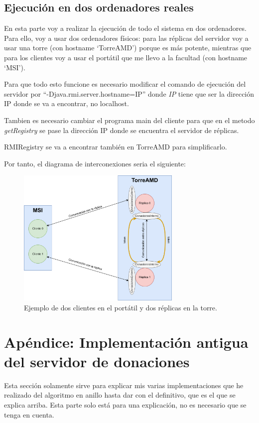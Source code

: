 \documentclass{article}
\begin{document}
\subsection{Ejecución en dos ordenadores reales}
En esta parte voy a realizar la ejecución de todo el sistema en dos ordenadores. Para ello, voy a usar dos ordenadores físicos: para las réplicas del servidor voy a usar una torre (con hostname `TorreAMD') porque es más potente, mientras que para los clientes voy a usar el portátil que me llevo a la facultad (con hostname `MSI').

Para que todo esto funcione es necesario modificar el comando de ejecución del servidor por ``-Djava.rmi.server.hostname=IP'' donde \textit{IP} tiene que ser la dirección IP donde se va a encontrar, no localhost.

Tambien es necesario cambiar el programa main del cliente para que en el metodo \textit{getRegistry} se pase la dirección IP donde se encuentra el servidor de réplicas.

RMIRegistry se va a encontrar también en TorreAMD para simplificarlo.

Por tanto, el diagrama de interconexiones seria el siguiente:

\begin{figure}[H]
    \centering
    \includegraphics[width=0.7\textwidth]{imagenes/variosOrdenadores.png}
    \caption{Ejemplo de dos clientes en el portátil y dos réplicas en la torre.}
\end{figure}



\section{Apéndice: Implementación antigua del servidor de donaciones}
Esta sección solamente sirve para explicar mis varias implementaciones que he realizado del algoritmo en anillo hasta dar con el definitivo, que es el que se explica arriba. Esta parte solo está para una explicación, no es necesario que se tenga en cuenta.
\end{document}
